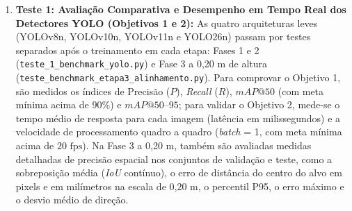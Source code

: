 \begin{enumerate}
	\item \textbf{Teste 1: Avaliação Comparativa e Desempenho em Tempo Real dos Detectores YOLO (Objetivos 1 e 2):} As quatro arquiteturas leves (YOLOv8n, YOLOv10n, YOLOv11n e YOLO26n) passam por testes separados após o treinamento em cada etapa: Fases 1 e 2 (\texttt{teste\_1\_\allowbreak benchmark\_\allowbreak yolo.py}) e Fase 3 a 0,20 m de altura (\texttt{teste\_benchmark\_\allowbreak etapa3\_\allowbreak alinhamento.py}). Para comprovar o Objetivo 1, são medidos os índices de Precisão ($P$), \textit{Recall} ($R$), $mAP@50$ (com meta mínima acima de $90\%$) e $mAP@50\text{--}95$; para validar o Objetivo 2, mede-se o tempo médio de resposta para cada imagem (latência em milissegundos) e a velocidade de processamento quadro a quadro (\textit{batch} = 1, com meta mínima acima de $20\text{ fps}$). Na Fase 3 a 0,20 m, também são avaliadas medidas detalhadas de precisão espacial nos conjuntos de validação e teste, como a sobreposição média (\textit{IoU} contínuo), o erro de distância do centro do alvo em pixels e em milímetros na escala de 0,20 m, o percentil P95, o erro máximo e o desvio médio de direção.
	

\end{enumerate}
